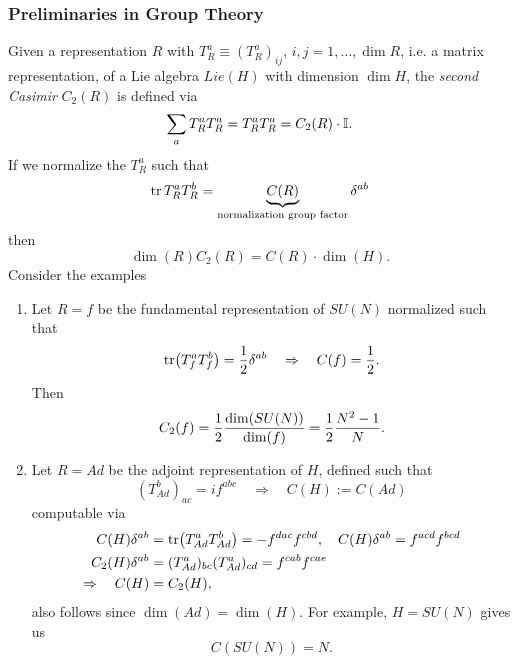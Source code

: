 \subsubsection{Preliminaries in Group Theory}
Given a representation $R$ with $T^a_R \equiv (T^a_R)_{ij}$, $i,j=1,\dots,\dim R$, i.e. a matrix representation, of a Lie algebra $Lie(H)$ with dimension $\dim H$, the \emph{second Casimir} $C_2(R)$ is defined via 
\begin{equation}
\sum_a T^a_R T^a_R = T^a_R T^a_R= C_2(R) \cdot \mathbb{I}.
\end{equation}
If we normalize the $T^a_R$ such that
\begin{equation}
\tr T^a_R T^b_R = \underbrace{C(R)}_{\text{normalization group factor}} \delta^{ab}
\end{equation}
then
\begin{equation}
\dim(R) C_2 (R) = C(R) \cdot \dim(H).
\end{equation}
Consider the examples
\begin{enumerate}
	\item Let $R=f$ be the fundamental representation of $SU(N)$ normalized such that\begin{equation}
	\tr(T^a_f T^b_f) = \frac{1}{2} \delta^{ab} \quad \Rightarrow \quad C(f) = \frac{1}{2}.
	\end{equation}
	Then 
	\begin{equation}
	C_2(f) = \frac{1}{2} \frac{\dim(SU(N)) }{\dim(f)} = \frac{1}{2} \frac{N^2-1}{N}.
	\end{equation}
	\item Let $R=Ad$ be the adjoint representation of $H$, defined such that 
	\begin{equation}
	(T^b_{Ad})_{ac} = i f^{abc} \quad \Rightarrow \quad C(H) := C(Ad)
	\end{equation}
	computable via
	\begin{align*}
		C(H)\delta^{ab} &= \tr(T^a_{Ad} T^b_{Ad})= -f^{dac} f^{cbd},\quad C(H) \delta^{ab} = f^{acd} f^{bcd} \\
		C_2(H) \delta^{ab} &= (T^a_{Ad})_{bc} (T^a_{Ad})_{cd} = f^{cab} f^{cae} \\
		\Rightarrow \quad C(H) & = C_2(H),
	\end{align*}
	also follows since $\dim(Ad)=\dim(H)$. For example, $H=SU(N)$ gives us 
	\begin{equation*}
		C(SU(N)) = N.
	\end{equation*}
\end{enumerate}



